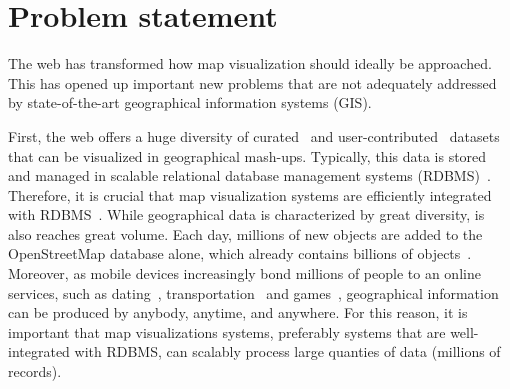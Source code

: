 \documentclass[11pt, oneside]{report}
\begin{document}
{%



\section{Problem statement}
\label{introduction:problem:statement}

The web has transformed how map visualization should ideally be approached. This has opened up important new problems that are not adequately addressed by state-of-the-art geographical information systems (GIS). 

First, the web offers a huge diversity of curated~\cite{gst2014digitalmapsupply} and user-contributed~\cite{openstreetmap, zooniverse2014oldweather} datasets that can be visualized in geographical mash-ups. Typically, this data is stored and managed in scalable relational database management systems (RDBMS)~\cite{wu2014case}. Therefore, it is crucial that map visualization systems are efficiently integrated with RDBMS~\cite{wu2014case}. While geographical data is characterized by great diversity, is also reaches great volume. Each day, millions of new objects are added to the OpenStreetMap database alone, which already contains billions of objects~\cite{openstreetmap2014stats}. Moreover, as mobile devices increasingly bond millions of people to an online services, such as dating~\cite{tinder2014tinder}, transportation~\cite{drivr2014drivr} and games~\cite{geocaching2014geocaching}, geographical information can be produced by anybody, anytime, and anywhere. For this reason, it is important that map visualizations systems, preferably systems that are well-integrated with RDBMS, can scalably process large quanties of data (millions of records).

}
\end{document}
